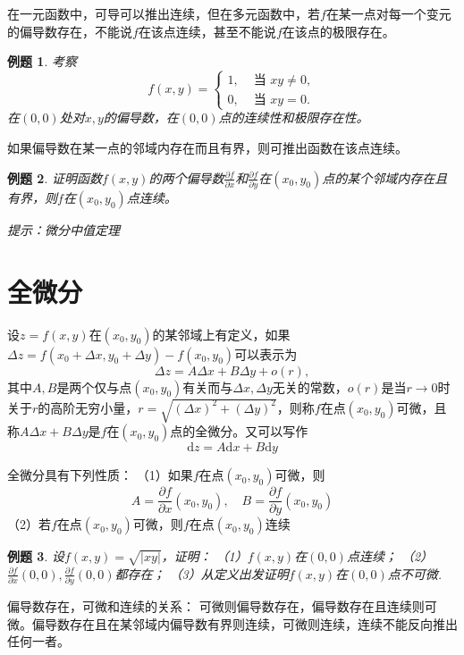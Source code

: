 \documentclass[UTF8]{ctexart}
\newtheorem{example}{例题}
\begin{document}
在一元函数中，可导可以推出连续，但在多元函数中，若$f$在某一点对每一个变元的偏导数存在，不能说$f$在该点连续，甚至不能说$f$在该点的极限存在。

\begin{example}
考察
$$f(x, y)=\left\{\begin{array}{ll}
1, & \text { 当 } x y \neq 0, \\
0, & \text { 当 } x y=0.
\end{array}\right.$$
在$(0,0)$处对$x,y$的偏导数，在$(0,0)$点的连续性和极限存在性。
\end{example}

如果偏导数在某一点的邻域内存在而且有界，则可推出函数在该点连续。

\begin{example}
证明函数$f(x,y)$的两个偏导数$\frac{\partial f}{\partial x}$和$\frac{\partial f}{\partial y}$在$(x_0,y_0)$点的某个邻域内存在且有界，则$f$在$(x_0,y_0)$点连续。

提示：微分中值定理
\end{example}

\section{全微分}

设$z=f(x,y)$在$(x_0,y_0)$的某邻域上有定义，如果$\Delta z=f(x_0+\Delta x,y_0+\Delta y)-f(x_0,y_0)$可以表示为
$$\Delta z=A \Delta x+B \Delta y+o(r),$$
其中$A,B$是两个仅与点$(x_0,y_0)$有关而与$\Delta x,\Delta y$无关的常数，$o(r)$是当$r\rightarrow 0$时关于$r$的高阶无穷小量，$r=\sqrt{(\Delta x)^{2}+(\Delta y)^{2}}$，则称$f$在点$(x_0,y_0)$可微，且称$A \Delta x+B \Delta y$是$f$在$(x_0,y_0)$点的全微分。又可以写作
$$\mathrm{d} z=A \mathrm{d} x+B \mathrm{d} y$$


全微分具有下列性质：
（1）如果$f$在点$(x_0,y_0)$可微，则
$$A=\frac{\partial f}{\partial x}\left(x_{0}, y_{0}\right), \quad B=\frac{\partial f}{\partial y}\left(x_{0}, y_{0}\right)$$
（2）若$f$在点$(x_0,y_0)$可微，则$f$在点$(x_0,y_0)$连续

\begin{example}
设$f(x,y)=\sqrt{|xy|}$，证明：
（1）$f(x,y)$在$(0,0)$点连续；
（2）$\frac{\partial f}{\partial x}(0,0), \frac{\partial f}{\partial y}(0,0)$都存在；
（3）从定义出发证明$f(x,y)$在$(0,0)$点不可微.
\end{example}

偏导数存在，可微和连续的关系：
可微则偏导数存在，偏导数存在且连续则可微。偏导数存在且在某邻域内偏导数有界则连续，可微则连续，连续不能反向推出任何一者。
\end{document}
